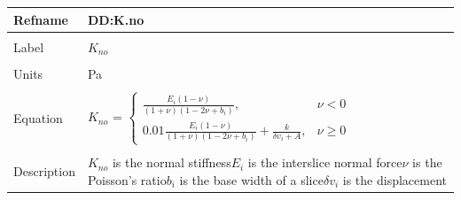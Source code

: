 \documentclass[12pt]{article}
\begin{document}
\noindent \begin{minipage}{\textwidth}
\begin{tabular}{p{} p{}}
\toprule \textbf{Refname} & \textbf{DD:K.no}
\label{DD:K.no}
\\ \midrule \\
Label & $K_{no}$
\\ \midrule \\
Units & Pa
\\ \midrule \\
Equation & $K_{no}$ = $\begin{cases}
\frac{E_{i}\left(1-\nu{}\right)}{\left(1+\nu{}\right)\left(1-2\nu{}+b_{i}\right)}, & \nu{}<0\\
0.01\frac{E_{i}\left(1-\nu{}\right)}{\left(1+\nu{}\right)\left(1-2\nu{}+b_{i}\right)}+\frac{k}{\delta{}v_{i}+A}, & \nu{}\geq{}0
\end{cases}$
\\ \midrule \\
Description & $K_{no}$ is the normal stiffness\newline$E_{i}$ is the interslice normal force\newline$\nu{}$ is the Poisson's ratio\newline$b_{i}$ is the base width of a slice\newline$\delta{}v_{i}$ is the displacement
\\ \bottomrule \end{tabular}
\end{minipage}\\
\end{document}
